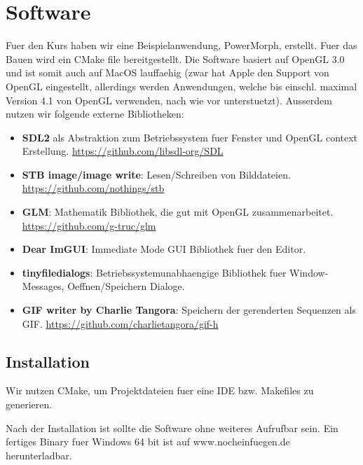 \chapter{Software}

Fuer den Kurs haben wir eine Beispielanwendung, PowerMorph, erstellt.
Fuer das Bauen wird ein CMake file bereitgestellt. Die Software basiert
auf OpenGL 3.0 und ist somit auch auf MacOS lauffaehig (zwar hat Apple
den Support von OpenGL eingestellt, allerdings werden Anwendungen, welche bis
einschl. maximal Version 4.1 von OpenGL verwenden, nach wie vor unterstuetzt).
Ausserdem nutzen wir folgende externe Bibliotheken:

\begin{itemize}
	\item \textbf{SDL2} als Abstraktion zum Betriebssystem fuer Fenster und OpenGL context Erstellung.
	\href{https://github.com/libsdl-org/SDL}{https://github.com/libsdl-org/SDL} 
	\item \textbf{STB image/image write}: Lesen/Schreiben von Bilddateien.
		\href{https://github.com/nothings/stb}{https://github.com/nothings/stb} 
	\item \textbf{GLM}: Mathematik Bibliothek, die gut mit OpenGL zusammenarbeitet. 
			\href{https://github.com/g-truc/glm}{https://github.com/g-truc/glm}
	\item \textbf{Dear ImGUI}: Immediate Mode GUI Bibliothek fuer den Editor.
	\item \textbf{tinyfiledialogs}: Betriebssystemunabhaengige Bibliothek fuer Window-Messages, Oeffnen/Speichern Dialoge.
	\item \textbf{GIF writer by Charlie Tangora}: Speichern der gerenderten Sequenzen als GIF.
				\href{https://github.com/charlietangora/gif-h}{https://github.com/charlietangora/gif-h} 
\end{itemize}

\section{Installation}

Wir nutzen CMake, um Projektdateien
fuer eine IDE bzw. Makefiles zu generieren. 

Nach der Installation ist sollte die Software ohne weiteres Aufrufbar sein. Ein fertiges Binary fuer Windows 64 bit ist auf 
www.nocheinfuegen.de herunterladbar.

